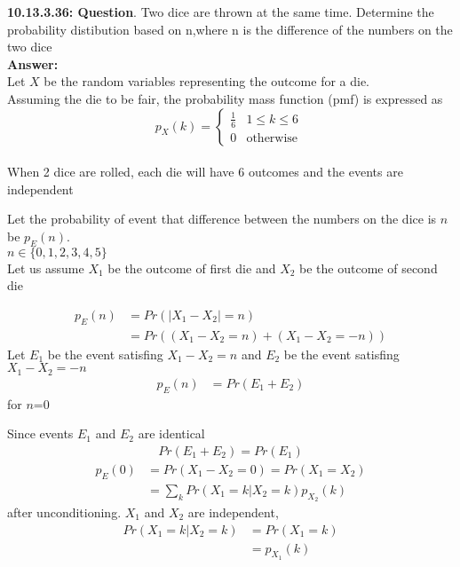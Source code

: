\documentclass[journal,12pt,twocolumn]{IEEEtran}
\begin{document}
\textbf{10.13.3.36: Question}. Two dice are thrown at the same time. Determine the probability distibution based on n,where n is the difference
of the numbers on the two dice \\
\textbf{Answer: }\\
Let $X$  be the random variables representing the outcome for a die.\\
Assuming the die to be fair, the probability mass function (pmf) is expressed as
 \begin{equation}
p_{X}(k) =  
\begin{cases}
    \frac{1}{6} &  1\leq  k\leq 6  \\
    0  & \text{otherwise } 
\end{cases}
\label{eq:1}
\end{equation}\\

When 2 dice are rolled, each die will have 6 outcomes and the events are independent 

Let the probability of event that difference between the numbers on the dice is $n$ be $p_E(n)$.\\

$n\in \{0,1,2,3,4,5\}$\\
Let us assume $X_1$ be the outcome of first die and $X_2$ be the outcome of second die

\begin{align}
	p_E(n)&=Pr(|X_1-X_2|=n) \nonumber\\
	&=Pr((X_1-X_2=n)+(X_1-X_2=-n))\nonumber
\end{align} 
Let $E_1$ be the event satisfing $X_1 - X_2 = n$ and $E_2$ be the event satisfing $X_1 - X_2 = -n$
\begin{align}
	p_E(n)&=Pr(E_1+E_2) \nonumber
\end{align} 
for $n$=0

Since events $E_1$ and $E_2$ are identical
\begin{align}
	Pr(E_1+E_2)=Pr(E_1)\nonumber
\end{align} 
\begin{align}
    p_E(0) &= Pr (X_1-X_2 = 0) = Pr (X_1 = X_2 )\nonumber\\
   	&=\sum_{k} Pr(X_1=k|X_2=k)p_{X_{2}}(k)\label{eq:03}
\end{align}
after unconditioning. $X_1$ and $X_2$ are independent,
\begin{align}
	Pr(X_1=k|X_2=k)&=Pr(X_1=k)\nonumber\\
                &=p_{X_{1}}(k)\label{eq:04}
\end{align} 
\end{document}
